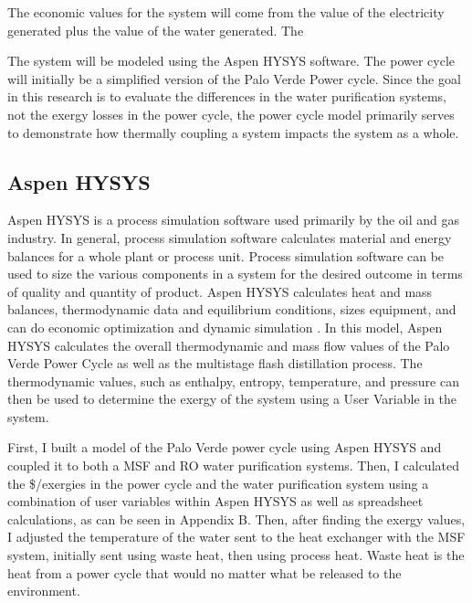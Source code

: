 \documentclass[12pt]{UIdahoMastersThesis}
\begin{document}
The economic values for the system will come from the value of the electricity generated plus the value of the water generated.  The 
 
 
The system will be modeled using the Aspen HYSYS software.  The power cycle will initially be a simplified version of the Palo Verde Power cycle.  Since the goal in this research is to evaluate the differences in the water purification systems, not the exergy losses in the power cycle, the power cycle model primarily serves to demonstrate how thermally coupling a system impacts the system as a whole.

\subsection{Aspen HYSYS}

Aspen HYSYS is a process simulation software used primarily by the oil and gas industry. In general, process simulation software calculates material and energy balances for a whole plant or process unit. Process simulation software can be used to size the various components in a system for the desired outcome in terms of quality and quantity of product. Aspen HYSYS calculates heat and mass balances, thermodynamic data and equilibrium conditions, sizes equipment, and can do economic optimization and dynamic simulation \cite{Oi2017}. In this model, Aspen HYSYS calculates the overall thermodynamic and mass flow values of the Palo Verde Power Cycle as well as the multistage flash distillation process. The thermodynamic values, such as enthalpy, entropy, temperature, and pressure can then be used to determine the exergy of the system using a User Variable in the system. 

First, I built a model of the Palo Verde power cycle using Aspen HYSYS and coupled it to both a MSF and RO water purification systems. Then, I calculated the \$/exergies in the power cycle and the water purification system using a combination of user variables within Aspen HYSYS as well as spreadsheet calculations, as can be seen in Appendix B. Then, after finding the exergy values, I adjusted the temperature of the water sent to the heat exchanger with the MSF system, initially sent using waste heat, then using process heat.  Waste heat is the heat from a power cycle that would no matter what be released to the environment. 
\end{document}
